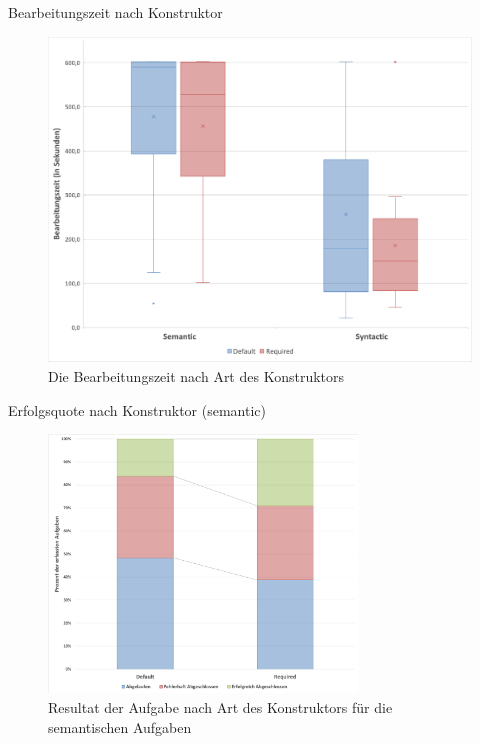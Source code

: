 \documentclass[10pt]{beamer}
\begin{document}
	\begin{frame}{Bearbeitungszeit nach Konstruktor}
		\begin{figure}
			\includegraphics[scale=0.32]{graphics/box_time-constructor.png}
			\caption{\label{fig:box_time-constructor.png} Die Bearbeitungszeit nach Art des Konstruktors}
		\end{figure}
	\end{frame}

	\begin{frame}{Erfolgsquote nach Konstruktor (semantic)}
		\begin{figure}
			\includegraphics[width=0.734\textwidth]{graphics/bar_result_sem.png}
			\caption{\label{fig:bar_result_sem.png} Resultat der Aufgabe nach Art des Konstruktors für die semantischen Aufgaben}
		\end{figure}
	\end{frame}
\end{document}
